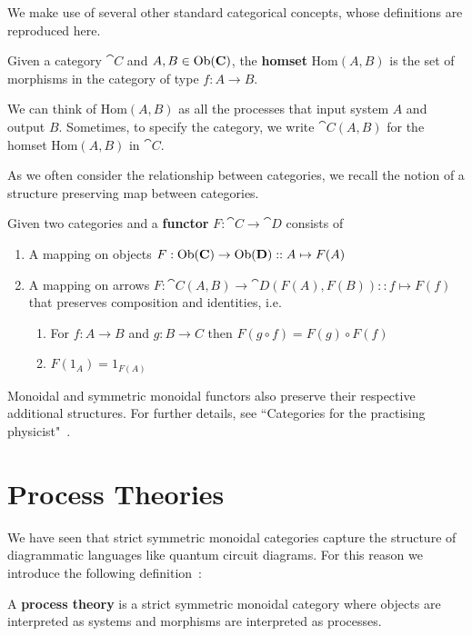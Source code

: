We make use of several other standard categorical concepts, whose definitions are reproduced here.

\begin{defn}
Given a category $\cat{C}$ and $A,B\in\mbox{Ob}(\mathbf{C})$, the \textbf{homset} Hom$(A,B)$ is the set of morphisms in the category of type $f:A\to B$.
\end{defn}

We can think of Hom$(A,B)$ as all the processes that input system $A$ and output $B$. Sometimes, to specify the category, we write $\cat{C}(A,B)$ for the homset Hom$(A,B)$ in $\cat{C}$.

As we often consider the relationship between categories, we recall the notion of a structure preserving map between categories.

\begin{defn}
Given two categories  and  a \textbf{functor} $F:\cat{C}\to\cat{D}$ consists of
\begin{enumerate}
\item A mapping on objects $F:\mbox{Ob}(\mathbf{C})\to\mbox{Ob}(\mathbf{D})::A\mapsto F(A)$
\item A mapping on arrows $F:\cat{C}(A,B)\to\cat{D}(F(A),F(B))::f\mapsto F(f)$ that preserves composition and identities, i.e. 
\begin{enumerate}
\item For $f:A\to B$ and $g:B\to C$ then $F(g\circ f) = F(g)\circ F(f)$
\item $F(1_A)=1_{F(A)}$
\end{enumerate}
\end{enumerate}
\end{defn}

\noindent Monoidal and symmetric monoidal functors also preserve their respective additional structures. For further details, see ``Categories for the practising physicist"~\cite{coecke2011categories}.

\section{Process Theories}
\label{sec:PTs}

We have seen that strict symmetric monoidal categories capture the structure of  diagrammatic languages like quantum circuit diagrams. For this reason we introduce the following definition~\cite{coecke2015generalised}:

\begin{defn}
A \textbf{process theory} is a strict symmetric monoidal category where objects are interpreted as systems and morphisms are interpreted as processes.
\end{defn}

